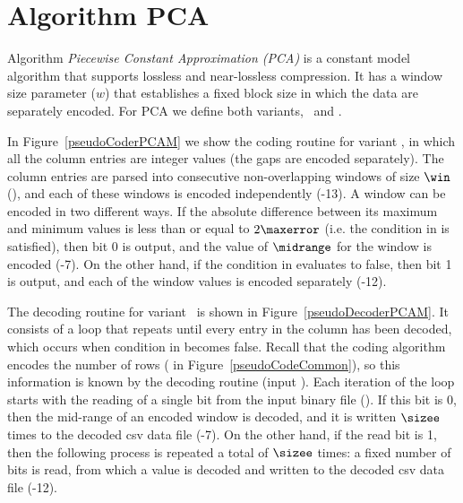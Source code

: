 
\vspace{-15pt}
\section{Algorithm PCA}
\label{algo:pca}


\vspace{-5pt}
Algorithm \textit{Piecewise Constant Approximation (PCA)} \cite{coder:pca} is a constant model algorithm that supports lossless and near-lossless compression. It has a window size parameter ($w$) that establishes a fixed block size in which the data are separately encoded. For PCA we define both variants, \maskalgo\ and \NOmaskalgo.


In Figure~\ref{pseudoCoderPCAM} we show the coding routine for variant \maskalgo, in which all the column entries are integer values (the gaps are encoded separately). The column entries are parsed into consecutive non-overlapping windows of size $\win$ (), and each of these windows is encoded independently (-13). A window can be encoded in two different ways. If the absolute difference between its maximum and minimum values is less than or equal to $2\maxerror$ (i.e. the condition in  is satisfied), then bit 0 is output, and the value of $\midrange$ for the window is encoded (-7). On the other hand, if the condition in  evaluates to false, then bit 1 is output, and each of the window values is encoded separately (-12).  


The decoding routine for variant \maskalgo\ is shown in Figure~\ref{pseudoDecoderPCAM}. It consists of a loop that repeats until every entry in the column has been decoded, which occurs when condition in  becomes false. Recall that the coding algorithm encodes the number of rows ( in Figure~\ref{pseudoCodeCommon}), so this information is known by the decoding routine (input \colSize). Each iteration of the loop starts with the reading of a single bit from the input binary file (). If this bit is 0, then the mid-range of an encoded window is decoded, and it is written $\sizee$ times to the decoded csv data file (-7). On the other hand, if the read bit is 1, then the following process is repeated a total of $\sizee$ times: a fixed number of bits is read, from which a value is decoded and written to the decoded csv data file (-12).


\clearpage





